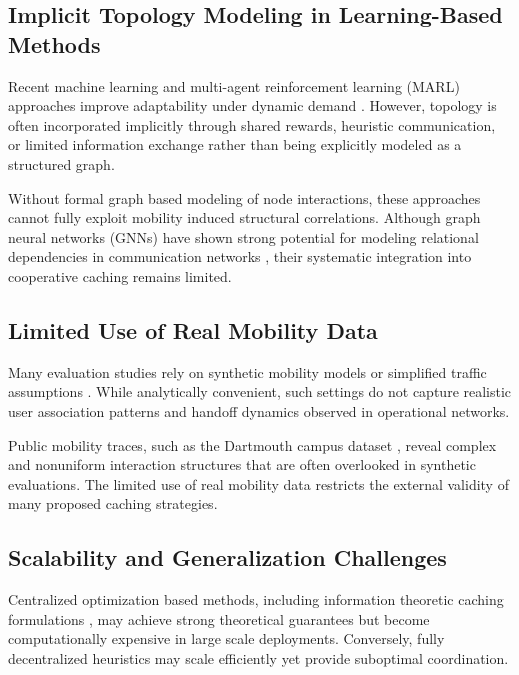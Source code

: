 \subsection{Implicit Topology Modeling in Learning-Based Methods}

Recent machine learning and multi-agent reinforcement learning (MARL) approaches improve adaptability under dynamic demand \cite{Shuja2021JNCA, Min2020MARL, zhou2023distributed}. However, topology is often incorporated implicitly through shared rewards, heuristic communication, or limited information exchange rather than being explicitly modeled as a structured graph.

Without formal graph based modeling of node interactions, these approaches cannot fully exploit mobility induced structural correlations. Although graph neural networks (GNNs) have shown strong potential for modeling relational dependencies in communication networks \cite{Rusek2019, Jiang2022Survey}, their systematic integration into cooperative caching remains limited.

\subsection{Limited Use of Real Mobility Data}

Many evaluation studies rely on synthetic mobility models or simplified traffic assumptions \cite{Shuja2021JNCA, Wang2017Mobility}. While analytically convenient, such settings do not capture realistic user association patterns and handoff dynamics observed in operational networks.

Public mobility traces, such as the Dartmouth campus dataset \cite{Kotz2004Dartmouth}, reveal complex and nonuniform interaction structures that are often overlooked in synthetic evaluations. The limited use of real mobility data restricts the external validity of many proposed caching strategies.

\subsection{Scalability and Generalization Challenges}

Centralized optimization based methods, including information theoretic caching formulations \cite{MaddahAli2014}, may achieve strong theoretical guarantees but become computationally expensive in large scale deployments. Conversely, fully decentralized heuristics may scale efficiently yet provide suboptimal coordination.

